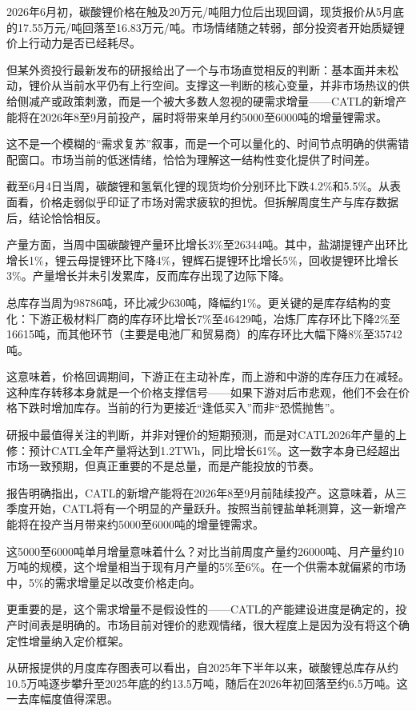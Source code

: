 \documentclass[11pt]{ctexart}
\begin{document}
2026年6月初，碳酸锂价格在触及20万元/吨阻力位后出现回调，现货报价从5月底的17.55万元/吨回落至16.83万元/吨。市场情绪随之转弱，部分投资者开始质疑锂价上行动力是否已经耗尽。

但某外资投行最新发布的研报给出了一个与市场直觉相反的判断：基本面并未松动，锂价从当前水平仍有上行空间。支撑这一判断的核心变量，并非市场热议的供给侧减产或政策刺激，而是一个被大多数人忽视的硬需求增量——CATL的新增产能将在2026年8至9月前投产，届时将带来单月约5000至6000吨的增量锂需求。

这不是一个模糊的“需求复苏”叙事，而是一个可以量化的、时间节点明确的供需错配窗口。市场当前的低迷情绪，恰恰为理解这一结构性变化提供了时间差。

截至6月4日当周，碳酸锂和氢氧化锂的现货均价分别环比下跌4.2\%和5.5\%。从表面看，价格走弱似乎印证了市场对需求疲软的担忧。但拆解周度生产与库存数据后，结论恰恰相反。

产量方面，当周中国碳酸锂产量环比增长3\%至26344吨。其中，盐湖提锂产出环比增长1\%，锂云母提锂环比下降4\%，锂辉石提锂环比增长5\%，回收提锂环比增长3\%。产量增长并未引发累库，反而库存出现了边际下降。

总库存当周为98786吨，环比减少630吨，降幅约1\%。更关键的是库存结构的变化：下游正极材料厂商的库存环比增长7\%至46429吨，冶炼厂库存环比下降2\%至16615吨，而其他环节（主要是电池厂和贸易商）的库存环比大幅下降8\%至35742吨。

这意味着，价格回调期间，下游正在主动补库，而上游和中游的库存压力在减轻。这种库存转移本身就是一个价格支撑信号——如果下游对后市悲观，他们不会在价格下跌时增加库存。当前的行为更接近“逢低买入”而非“恐慌抛售”。

研报中最值得关注的判断，并非对锂价的短期预测，而是对CATL2026年产量的上修：预计CATL全年产量将达到1.2TWh，同比增长61\%。这一数字本身已经超出市场一致预期，但真正重要的不是总量，而是产能投放的节奏。

报告明确指出，CATL的新增产能将在2026年8至9月前陆续投产。这意味着，从三季度开始，CATL将有一个明显的产量跃升。按照当前锂盐单耗测算，这一新增产能将在投产当月带来约5000至6000吨的增量锂需求。

这5000至6000吨单月增量意味着什么？对比当前周度产量约26000吨、月产量约10万吨的规模，这个增量相当于现有月产量的5\%至6\%。在一个供需本就偏紧的市场中，5\%的需求增量足以改变价格走向。

更重要的是，这个需求增量不是假设性的——CATL的产能建设进度是确定的，投产时间表是明确的。市场目前对锂价的悲观情绪，很大程度上是因为没有将这个确定性增量纳入定价框架。

从研报提供的月度库存图表可以看出，自2025年下半年以来，碳酸锂总库存从约10.5万吨逐步攀升至2025年底的约13.5万吨，随后在2026年初回落至约6.5万吨。这一去库幅度值得深思。
\end{document}
